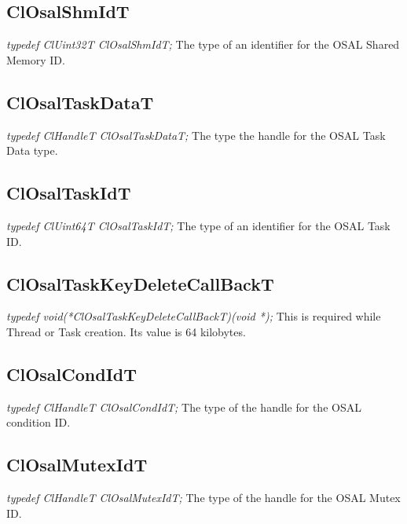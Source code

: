\subsection{ClOsalShmIdT}
\textit{typedef ClUint32T ClOsalShmIdT;}
\newline
\newline
The type of an identifier for the OSAL Shared Memory ID.

\subsection{ClOsalTaskDataT}
\textit{typedef ClHandleT ClOsalTaskDataT;}
\newline
\newline
The type the handle for the OSAL Task Data type.

\subsection{ClOsalTaskIdT}
\textit{typedef ClUint64T ClOsalTaskIdT;}
\newline
\newline
The type of an identifier for the OSAL Task ID.

\subsection{ClOsalTaskKeyDeleteCallBackT}
\textit{typedef void(*ClOsalTaskKeyDeleteCallBackT)(void *);}
\newline
\newline
This is required while Thread or Task creation. Its value is 64 kilobytes.


\subsection{ClOsalCondIdT}
\textit{typedef ClHandleT ClOsalCondIdT;}
\newline
\newline
The type of the handle for the OSAL condition ID.


\subsection{ClOsalMutexIdT}
\textit{typedef ClHandleT ClOsalMutexIdT;}
\newline
\newline
The type of the handle for the OSAL Mutex ID.



